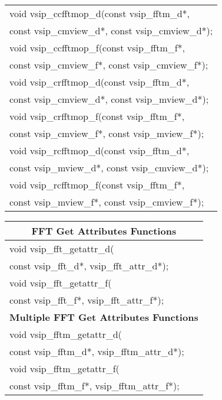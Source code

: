 {\begin{tabular}[H]{|l|}
void vsip\_ccfftmop\_d(const vsip\_fftm\_d*,\\*\hspace{.7cm} const vsip\_cmview\_d*, const vsip\_cmview\_d*);\\
void vsip\_ccfftmop\_f(const vsip\_fftm\_f*,\\*\hspace{.7cm} const vsip\_cmview\_f*, const vsip\_cmview\_f*);\\
void vsip\_crfftmop\_d(const vsip\_fftm\_d*,\\*\hspace{.7cm} const vsip\_cmview\_d*, const vsip\_mview\_d*);\\
void vsip\_crfftmop\_f(const vsip\_fftm\_f*,\\*\hspace{.7cm} const vsip\_cmview\_f*, const vsip\_mview\_f*);\\
void vsip\_rcfftmop\_d(const vsip\_fftm\_d*,\\*\hspace{.7cm} const vsip\_mview\_d*, const vsip\_cmview\_d*);\\
void vsip\_rcfftmop\_f(const vsip\_fftm\_f*,\\*\hspace{.7cm} const vsip\_mview\_f*, const vsip\_cmview\_f*);\\ \hline \end{tabular}
}
\clearpage
\hspace*{1.cm} {
\ttfamily
\begin{tabular}[H]{|l|}
\multicolumn{1}{c}{\rmfamily \bfseries FFT Get Attributes Functions}\\ \hline
void vsip\_fft\_getattr\_d(\\*\hspace{.7cm}const vsip\_fft\_d*, vsip\_fft\_attr\_d*);\\
void vsip\_fft\_getattr\_f(\\*\hspace{.7cm}const vsip\_fft\_f*, vsip\_fft\_attr\_f*);\\
\hline \multicolumn{1}{c}{\rmfamily \bfseries Multiple FFT Get Attributes Functions}\\ \hline
void vsip\_fftm\_getattr\_d(\\*\hspace{.7cm}const vsip\_fftm\_d*, vsip\_fftm\_attr\_d*);\\
void vsip\_fftm\_getattr\_f(\\*\hspace{.7cm}const vsip\_fftm\_f*, vsip\_fftm\_attr\_f*);\\
\hline\end{tabular}
}
